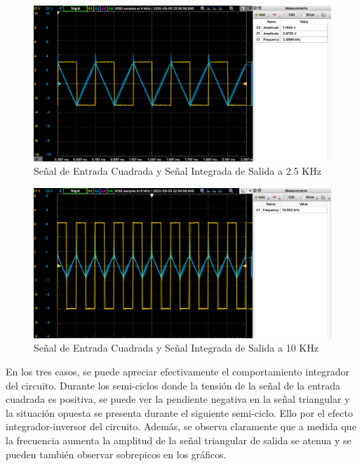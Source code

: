 \begin{figure}[H]
    \centering 
    \includegraphics [scale=0.4] {../Ejercicio3-CircuitoIntegradoresyDerivadores/Imagenes/cuadrada-2500.png} 
    \caption{Señal de Entrada Cuadrada y Señal Integrada de Salida a 2.5 KHz}
    \label{fig:emptyPlotTool}
\end{figure}

\begin{figure}[H]
    \centering 
    \includegraphics [scale=0.4] {../Ejercicio3-CircuitoIntegradoresyDerivadores/Imagenes/cuadrada-10000.png} 
    \caption{Señal de Entrada Cuadrada y Señal Integrada de Salida a 10 KHz}
    \label{fig:emptyPlotTool}
\end{figure}

En los tres casos, se puede apreciar efectivamente el comportamiento integrador del circuito. Durante los semi-ciclos donde la tensión de la señal 
de la entrada cuadrada es positiva, se puede ver la pendiente negativa en la señal triangular y la situación opuesta se presenta durante el siguiente semi-ciclo.
Ello por el efecto integrador-inversor del circuito.
Además, se observa claramente que a medida que la frecuencia aumenta la amplitud de la señal triangular de salida se atenua y se pueden también observar
sobrepicos en los gráficos.

